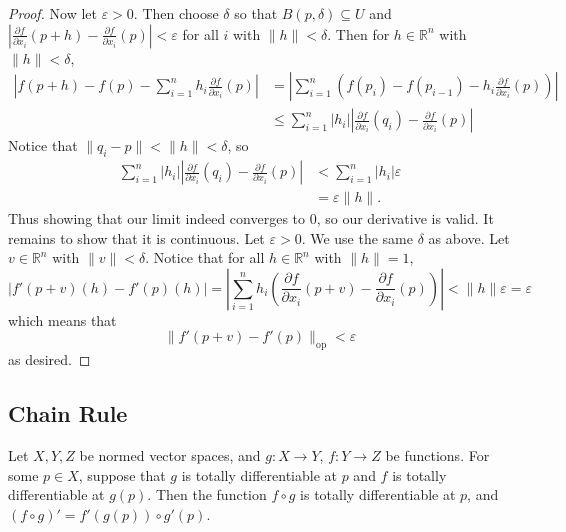 \documentclass{article}
\newcommand{\op}{\mathrm{op}}
\theoremstyle{plain} %
\numberwithin{thm}{section} %
\theoremstyle{definition}
\begin{document}
\begin{proof}
        Now let \(\varepsilon > 0\). Then choose \(\delta\) so that \(B(p, \delta) \subseteq U\) and \(\left\vert\frac{\partial f}{\partial x_i} (p + h) - \frac{\partial f}{\partial x_i} (p)\right\vert < \varepsilon\) for all \(i\) with \(\|h\| < \delta\). Then for \(h \in \mathbb{R}^n\) with \(\|h\| < \delta\),
        \begin{align*}
            \left\vert f(p + h) - f(p) - \sum_{i=1}^{n} h_i \frac{\partial f}{\partial x_i} (p)  \right\vert &= \left\vert \sum_{i=1}^{n} \left(f(p_i) - f(p_{i-1}) - h_i \frac{\partial f}{\partial x_i} (p)\right) \right\vert \\
            &\leq \sum_{i=1}^{n} |h_i| \left\vert \frac{\partial f}{\partial x_i} (q_i) - \frac{\partial f}{\partial x_i} (p) \right\vert
        \end{align*}
        Notice that \(\|q_i - p\| < \|h\| < \delta\), so
        \begin{align*}
            \sum_{i=1}^{n} |h_i| \left\vert \frac{\partial f}{\partial x_i} (q_i) - \frac{\partial f}{\partial x_i} (p) \right\vert &< \sum_{i=1}^{n} |h_i| \varepsilon \\
            &= \varepsilon \|h\|.
        \end{align*}
        Thus showing that our limit indeed converges to 0, so our derivative is valid. It remains to show that it is continuous. Let \(\varepsilon > 0\). We use the same \(\delta\) as above. Let \(v \in \mathbb{R}^n\) with \(\|v\| < \delta\). Notice that for all \(h \in \mathbb{R}^n\) with \(\|h\| = 1\),
        \[
            |f'(p + v)(h) - f'(p)(h)| = \left\vert\sum_{i=1}^{n} h_i \left( \frac{\partial f}{\partial x_i} (p + v) - \frac{\partial f}{\partial x_i} (p) \right)\right\vert < \|h\| \varepsilon = \varepsilon
        \]
        which means that
        \[
            \|f'(p+v) - f'(p)\| _{\op} < \varepsilon
        \]
        as desired.
    \end{proof}

    \subsection{Chain Rule}

    Let \(X,Y,Z\) be normed vector spaces, and \(g: X \to Y\), \(f: Y \to Z\) be functions. For some \(p \in X\), suppose that \(g\) is totally differentiable at \(p\) and \(f\) is totally differentiable at \(g(p)\). Then the function \(f \circ g\) is totally differentiable at \(p\), and \((f \circ g)' = f'(g(p)) \circ g'(p)\).
\end{document}
